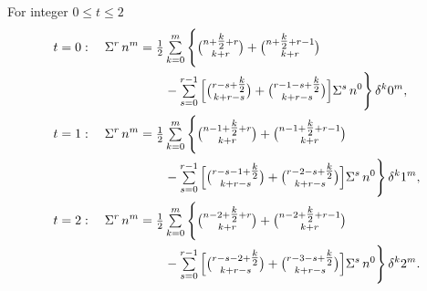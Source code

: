 \begin{example}
  For integer $0 \leq t \leq 2$
  \begin{align*}
    t=0:\quad
    \Sigma^{r}\,{n}^{m}
    &=
    \tfrac12
    \mathop{\textstyle\sum}_{k=0}^{m}
    \Bigg\{
      \tbinom{n+\tfrac{k}{2}+r}{k+r}
      +
      \tbinom{n+\tfrac{k}{2}+r-1}{k+r}
      \\
      &\qquad-
      \mathop{\textstyle\sum}_{s=0}^{r-1}
      \Big[
        \tbinom{r-s+\tfrac{k}{2}}{k+r-s}
        +
        \tbinom{r-1-s+\tfrac{k}{2}}{k+r-s}
      \Big]
      \Sigma^{s}\,{n}^{0}
    \Bigg\}
    \,\delta^k 0^m ,
    \\
    t=1:\quad
    \Sigma^{r}\,{n}^{m}
    &=
    \tfrac12
    \mathop{\textstyle\sum}_{k=0}^{m}
    \Bigg\{
      \tbinom{n-1+\tfrac{k}{2}+r}{k+r}
      +
      \tbinom{n-1+\tfrac{k}{2}+r-1}{k+r}
      \\
      &\qquad-
      \mathop{\textstyle\sum}_{s=0}^{r-1}
      \Big[
        \tbinom{r-s-1+\tfrac{k}{2}}{k+r-s}
        +
        \tbinom{r-2-s+\tfrac{k}{2}}{k+r-s}
      \Big]
      \Sigma^{s}\,{n}^{0}
    \Bigg\}
    \,\delta^k 1^m ,
    \\
    t=2:\quad
    \Sigma^{r}\,{n}^{m}
    &=
    \tfrac12
    \mathop{\textstyle\sum}_{k=0}^{m}
    \Bigg\{
      \tbinom{n-2+\tfrac{k}{2}+r}{k+r}
      +
      \tbinom{n-2+\tfrac{k}{2}+r-1}{k+r}
      \\
      &\qquad-
      \mathop{\textstyle\sum}_{s=0}^{r-1}
      \Big[
        \tbinom{r-s-2+\tfrac{k}{2}}{k+r-s}
        +
        \tbinom{r-3-s+\tfrac{k}{2}}{k+r-s}
      \Big]
      \Sigma^{s}\,{n}^{0}
    \Bigg\}
    \,\delta^k 2^m .
  \end{align*}
\end{example}
